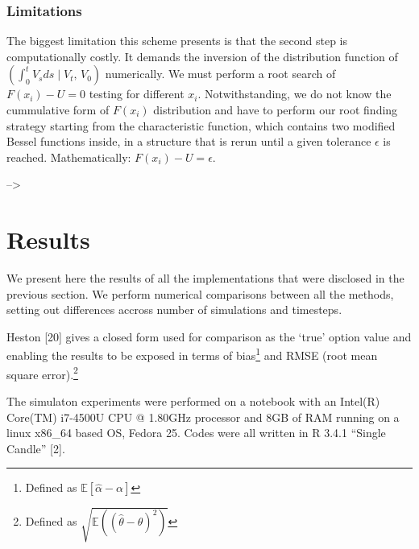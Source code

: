 \documentclass[12pt,twoside]{reedthesis}
\theoremstyle{definition}
\theoremstyle{definition}
\theoremstyle{remark}
\begin{document}
  \subsection{Limitations}\label{limitations-1}
  
  The biggest limitation this scheme presents is that the second step is
  computationally costly. It demands the inversion of the distribution
  function of
  \(\left( \displaystyle \int_0^t V_sds \mid V_t, \, V_0 \right)\)
  numerically. We must perform a root search of \(F(x_i) - U = 0\) testing
  for different \(x_i\). Notwithstanding, we do not know the cummulative
  form of \(F(x_i)\) distribution and have to perform our root finding
  strategy starting from the characteristic function, which contains two
  modified Bessel functions inside, in a structure that is rerun until a
  given tolerance \(\epsilon\) is reached. Mathematically:
  \(F(x_i) - U = \epsilon\).
  
  --\textgreater{}
  
  \chapter{Results}\label{results}
  
  We present here the results of all the implementations that were
  disclosed in the previous section. We perform numerical comparisons
  between all the methods, setting out differences accross number of
  simulations and timesteps.
  
  Heston {[}20{]} gives a closed form used for comparison as the `true'
  option value and enabling the results to be exposed in terms of
  bias\footnote{Defined as
    \(\mathbb{E} \left[ \hat{\alpha} - \alpha \right]\)} and RMSE (root
  mean square error).\footnote{Defined as
    \(\sqrt{\mathbb{E}((\hat{\theta}-\theta)^2)}\)}
  
  The simulaton experiments were performed on a notebook with an Intel(R)
  Core(TM) i7-4500U CPU @ 1.80GHz processor and 8GB of RAM running on a
  linux x86\_64 based OS, Fedora 25. Codes were all written in R 3.4.1
  ``Single Candle'' {[}2{]}.
  
\end{document}
